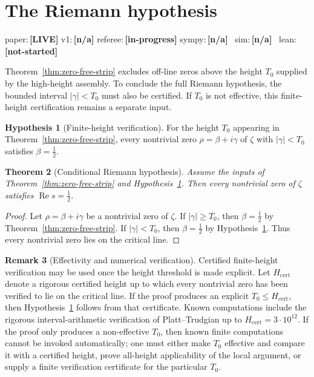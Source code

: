 \documentclass[11pt,a4paper]{amsart}
\numberwithin{equation}{section}
\theoremstyle{plain}
\newtheorem{theorem}{Theorem}[section]
\theoremstyle{definition}
\newtheorem{remark}[theorem]{Remark}
\newtheorem{hypothesis}[theorem]{Hypothesis}
\newcommand{\RePart}{\operatorname{Re}}
\newcommand{\status}[1]{\textbf{\scriptsize[#1]}}
\newcommand{\statuspaper}[1]{\textsf{\footnotesize paper:}\,\status{#1}}
\newcommand{\statusmig}[1]{\textsf{\footnotesize v1:}\,\status{#1}}
\newcommand{\statusreferee}[1]{\textsf{\footnotesize referee:}\,\status{#1}}
\newcommand{\statussympy}[2][\relax]{%
  \textsf{\footnotesize sympy:}\,\status{#2}%
  \ifx\relax#1\else\,\textsf{\scriptsize\texttt{#1}}\fi%
}
\newcommand{\statussim}[2][\relax]{%
  \textsf{\footnotesize sim:}\,\status{#2}%
  \ifx\relax#1\else\,\textsf{\scriptsize\texttt{#1}}\fi%
}
\newcommand{\statuslean}[2][\relax]{%
  \textsf{\footnotesize lean:}\,\status{#2}%
  \ifx\relax#1\else\,\textsf{\scriptsize\texttt{#1}}\fi%
}
\begin{document}
\section{The Riemann hypothesis}
\label{sec:riemann-hypothesis}
\statuspaper{LIVE}\quad
\statusmig{n/a}\quad
\statusreferee{in-progress}\quad
\statussympy{n/a}\quad
\statussim{n/a}\quad
\statuslean{not-started}
\par\medskip

Theorem~\ref{thm:zero-free-strip} excludes off-line zeros above the height
\(T_0\) supplied by the high-height assembly.  To conclude the full Riemann
hypothesis, the bounded interval \(|\gamma|<T_0\) must also be certified.  If
\(T_0\) is not effective, this finite-height certification remains a separate
input.

\begin{hypothesis}[Finite-height verification]
\label{hyp:finite-height-verification}
For the height \(T_0\) appearing in Theorem~\ref{thm:zero-free-strip}, every
nontrivial zero \(\rho=\beta+i\gamma\) of \(\zeta\) with \(|\gamma|<T_0\)
satisfies \(\beta=\tfrac12\).
\end{hypothesis}

\begin{theorem}[Conditional Riemann hypothesis]
\label{thm:riemann-hypothesis}
Assume the inputs of Theorem~\ref{thm:zero-free-strip} and
Hypothesis~\ref{hyp:finite-height-verification}.  Then every nontrivial zero
of \(\zeta\) satisfies \(\RePart s = \tfrac12\).
\end{theorem}

\begin{proof}
Let \(\rho=\beta+i\gamma\) be a nontrivial zero of \(\zeta\).  If
\(|\gamma|\ge T_0\), then \(\beta=\tfrac12\) by
Theorem~\ref{thm:zero-free-strip}.  If \(|\gamma|<T_0\), then
\(\beta=\tfrac12\) by Hypothesis~\ref{hyp:finite-height-verification}.
Thus every nontrivial zero lies on the critical line.
\end{proof}

\begin{remark}[Effectivity and numerical verification]
\label{rem:finite-height-effectivity}
Certified finite-height verification may be used once the height threshold is
made explicit.  Let \(H_{\mathrm{cert}}\) denote a rigorous certified height up
to which every nontrivial zero has been verified to lie on the critical line.
If the proof produces an explicit \(T_0\le H_{\mathrm{cert}}\), then
Hypothesis~\ref{hyp:finite-height-verification} follows from that certificate.
Known computations include the rigorous interval-arithmetic verification of
Platt--Trudgian up to \(H_{\mathrm{cert}}=3\cdot10^{12}\).  If the proof only
produces a non-effective \(T_0\), then known finite computations cannot be
invoked automatically; one must either make \(T_0\) effective and compare it
with a certified height, prove all-height applicability of the local argument,
or supply a finite verification certificate for the particular \(T_0\).
\end{remark}
\end{document}
